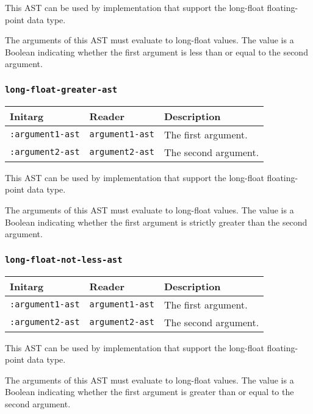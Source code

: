 This AST can be used by implementation that support the long-float
floating-point data type.  

The arguments of this AST must evaluate to long-float
values.  The value is a Boolean indicating whether the first argument
is less than or equal to the second argument.

\subsubsection{\texttt{long-float-greater-ast}}
\label{sec-ast-long-float-greater}

\begin{tabular}{|l|l|l|}
\hline
Initarg & Reader & Description\\
\hline\hline
\texttt{:argument1-ast} & \texttt{argument1-ast} & The first argument.\\
\hline
\texttt{:argument2-ast} & \texttt{argument2-ast} & The second argument.\\
\hline
\end{tabular}

This AST can be used by implementation that support the long-float
floating-point data type.  

The arguments of this AST must evaluate to long-float
values.  The value is a Boolean indicating whether the first argument
is strictly greater than the second argument.

\subsubsection{\texttt{long-float-not-less-ast}}
\label{sec-ast-long-float-not-less}

\begin{tabular}{|l|l|l|}
\hline
Initarg & Reader & Description\\
\hline\hline
\texttt{:argument1-ast} & \texttt{argument1-ast} & The first argument.\\
\hline
\texttt{:argument2-ast} & \texttt{argument2-ast} & The second argument.\\
\hline
\end{tabular}

This AST can be used by implementation that support the long-float
floating-point data type.  

The arguments of this AST must evaluate to long-float
values.  The value is a Boolean indicating whether the first argument
is greater than or equal to the second argument.

